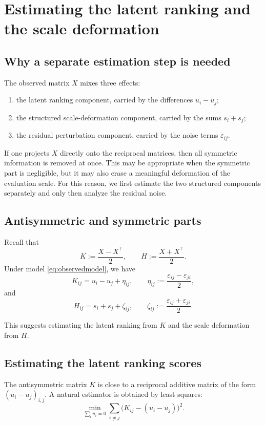 \documentclass[11pt]{amsart}
\theoremstyle{definition}
\theoremstyle{plain}
\numberwithin{equation}{section}
\begin{document}
\section{Estimating the latent ranking and the scale deformation}

\subsection{Why a separate estimation step is needed}

The observed matrix $X$ mixes three effects:
\begin{enumerate}[label=\textup{(\arabic*)}]
\item the latent ranking component, carried by the differences $u_i-u_j$;
\item the structured scale-deformation component, carried by the sums $s_i+s_j$;
\item the residual perturbation component, carried by the noise terms $\varepsilon_{ij}$.
\end{enumerate}

If one projects $X$ directly onto the reciprocal matrices, then all symmetric information is removed at once. This may be appropriate when the symmetric part is negligible, but it may also erase a meaningful deformation of the evaluation scale. For this reason, we first estimate the two structured components separately and only then analyze the residual noise.

\subsection{Antisymmetric and symmetric parts}

Recall that
\[
K:=\frac{X-X^\top}{2},
\qquad
H:=\frac{X+X^\top}{2}.
\]
Under model \eqref{eq:observedmodel}, we have
\[
K_{ij}=u_i-u_j+\eta_{ij},
\qquad
\eta_{ij}:=\frac{\varepsilon_{ij}-\varepsilon_{ji}}{2},
\]
and
\[
H_{ij}=s_i+s_j+\zeta_{ij},
\qquad
\zeta_{ij}:=\frac{\varepsilon_{ij}+\varepsilon_{ji}}{2}.
\]

This suggests estimating the latent ranking from $K$ and the scale deformation from $H$.

\subsection{Estimating the latent ranking scores}

The antisymmetric matrix $K$ is close to a reciprocal additive matrix of the form
\(
(u_i-u_j)_{i,j}.
\)
A natural estimator is obtained by least squares:
\[
\min_{\sum_i u_i=0}
\sum_{i\neq j}\bigl(K_{ij}-(u_i-u_j)\bigr)^2.
\]
\end{document}
